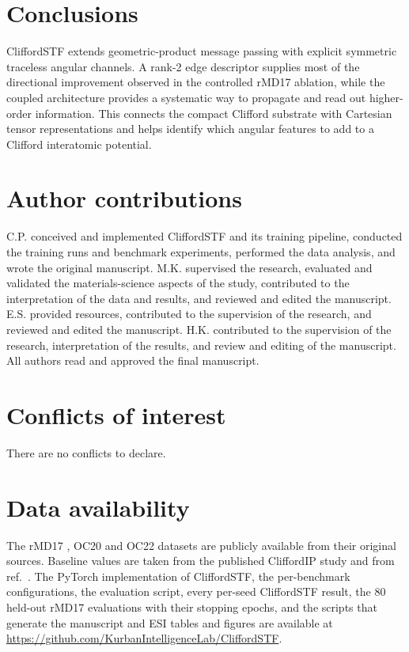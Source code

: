 \documentclass[twoside,twocolumn,9pt]{extarticle}
\begin{document}







\section*{Conclusions}

CliffordSTF extends geometric-product message passing with explicit symmetric traceless angular channels. A rank-2 edge descriptor supplies most of the directional improvement observed in the controlled rMD17 ablation, while the coupled architecture provides a systematic way to propagate and read out higher-order information. This connects the compact Clifford substrate with Cartesian tensor representations and helps identify which angular features to add to a Clifford interatomic potential.

\section*{Author contributions}

C.P. conceived and implemented CliffordSTF and its training pipeline, conducted the training runs and benchmark experiments, performed the data analysis, and wrote the original manuscript. M.K. supervised the research, evaluated and validated the materials-science aspects of the study, contributed to the interpretation of the data and results, and reviewed and edited the manuscript. E.S. provided resources, contributed to the supervision of the research, and reviewed and edited the manuscript. H.K. contributed to the supervision of the research, interpretation of the results, and review and editing of the manuscript. All authors read and approved the final manuscript.

\section*{Conflicts of interest}

There are no conflicts to declare.

\section*{Data availability}

The rMD17 \cite{christensen2020role}, OC20 \cite{chanussot2021oc20} and OC22 \cite{tran2023oc22} datasets are publicly available from their original sources. Baseline values are taken from the published CliffordIP study \cite{polat2026cliffordip} and from ref.~. The PyTorch implementation of CliffordSTF, the per-benchmark configurations, the evaluation script, every per-seed CliffordSTF result, the 80 held-out rMD17 evaluations with their stopping epochs, and the scripts that generate the manuscript and ESI tables and figures are available at \url{https://github.com/KurbanIntelligenceLab/CliffordSTF}.
\end{document}

